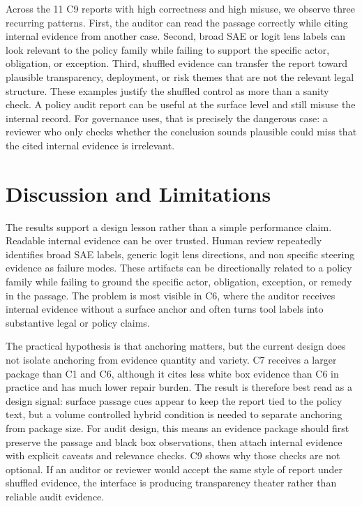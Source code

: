 \documentclass{article}
\begin{document}
Across the 11 C9 reports with high correctness and high misuse, we observe three recurring patterns. First, the auditor can read the passage correctly while citing internal evidence from another case. Second, broad SAE or logit lens labels can look relevant to the policy family while failing to support the specific actor, obligation, or exception. Third, shuffled evidence can transfer the report toward plausible transparency, deployment, or risk themes that are not the relevant legal structure. These examples justify the shuffled control as more than a sanity check. A policy audit report can be useful at the surface level and still misuse the internal record. For governance uses, that is precisely the dangerous case: a reviewer who only checks whether the conclusion sounds plausible could miss that the cited internal evidence is irrelevant.

\FloatBarrier

\section{Discussion and Limitations}

The results support a design lesson rather than a simple performance claim. Readable internal evidence can be over trusted. Human review repeatedly identifies broad SAE labels, generic logit lens directions, and non specific steering evidence as failure modes. These artifacts can be directionally related to a policy family while failing to ground the specific actor, obligation, exception, or remedy in the passage. The problem is most visible in C6, where the auditor receives internal evidence without a surface anchor and often turns tool labels into substantive legal or policy claims.

The practical hypothesis is that anchoring matters, but the current design does not isolate anchoring from evidence quantity and variety. C7 receives a larger package than C1 and C6, although it cites less white box evidence than C6 in practice and has much lower repair burden. The result is therefore best read as a design signal: surface passage cues appear to keep the report tied to the policy text, but a volume controlled hybrid condition is needed to separate anchoring from package size. For audit design, this means an evidence package should first preserve the passage and black box observations, then attach internal evidence with explicit caveats and relevance checks. C9 shows why those checks are not optional. If an auditor or reviewer would accept the same style of report under shuffled evidence, the interface is producing transparency theater rather than reliable audit evidence.
\end{document}
